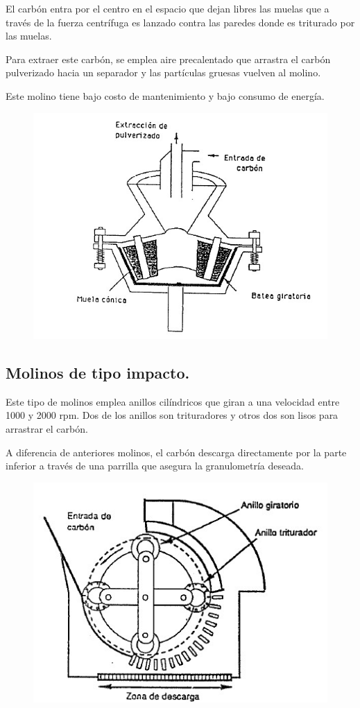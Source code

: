 El carbón entra por el centro en el espacio que dejan libres las muelas que a través de la fuerza centrífuga es lanzado contra las paredes donde es triturado por las muelas.


Para extraer este carbón, se emplea aire precalentado que arrastra el carbón pulverizado hacia un separador y las partículas gruesas vuelven al molino.


Este molino tiene bajo costo de mantenimiento y bajo consumo de energía.

\begin{figure}[H]
	\centering
	\includegraphics[width=0.5\linewidth]{res/tema10/bateaMovil}
	\label{fig:bateamovil}
\end{figure}


\subsection{Molinos de tipo impacto.}
Este tipo de molinos emplea anillos cilíndricos que giran a una velocidad entre 1000 y 2000 rpm. Dos de los anillos son trituradores y otros dos son lisos para arrastrar el carbón.


A diferencia de anteriores molinos, el carbón descarga directamente por la parte inferior a través de una parrilla que asegura la granulometría deseada.
\begin{figure}[H]
	\centering
	\includegraphics[width=0.5\linewidth]{res/tema10/impacto}
	\label{fig:impacto}
\end{figure}

